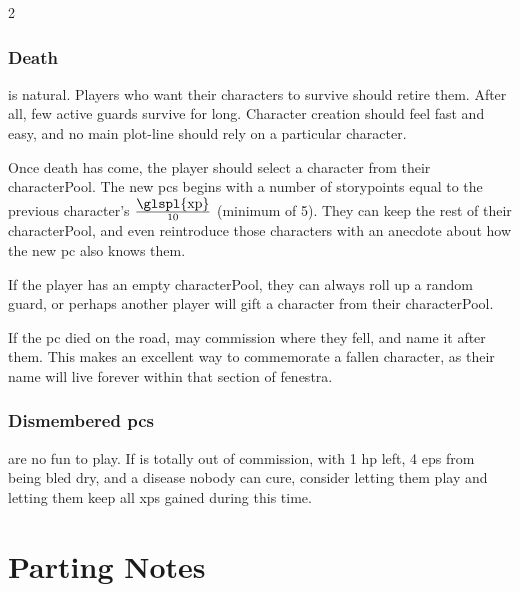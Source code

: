 \begin{multicols}{2}
\subsubsection{Death}
\label{pcdeath}
is natural.
Players who want their characters to survive should retire them.
After all, few active \glspl{guard} survive for long.
Character creation should feel fast and easy, and no main plot-line should rely on a particular character.

Once death has come, the player should select a character from their \gls{characterPool}.
The new \glspl{pc} begins with a number of \glspl{storypoint} equal to the previous character's $\frac{\mbox{\glspl{xp}}}{10}$
(minimum of 5).%
They can keep the rest of their \gls{characterPool}, and even reintroduce those characters with an anecdote about how the new \gls{pc} also knows them.

If the player has an empty \gls{characterPool}, they can always roll up a random \gls{guard}, or perhaps another player will gift a character from their \gls{characterPool}.

If the \gls{pc} died on the road,  may commission  where they fell, and name it after them.
This makes an excellent way to commemorate a fallen character, as their name will live forever within that section of \gls{fenestra}.

\subsubsection{Dismembered \Glspl{pc}}
are no fun to play.
If  is totally out of commission, with 1 \gls{hp} left, 4 \glspl{ep} from being bled dry, and a disease nobody can cure, consider letting them play  and letting them keep all \glspl{xp} gained during this time.

\end{multicols}

\section{Parting Notes}

